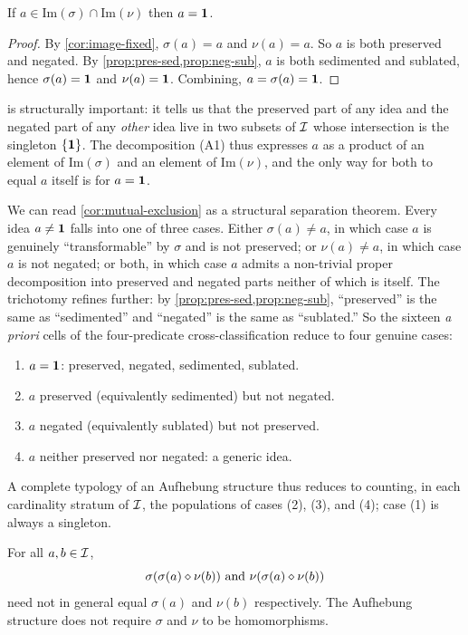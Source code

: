 \begin{corollary}\label{cor:mutual-exclusion}
If $a\in\mathrm{Im}(\sigma)\cap\mathrm{Im}(\nu)$ then $a=\mathbf{1}$.
\end{corollary}

\begin{proof}
By \cref{cor:image-fixed}, $\sigma(a)=a$ and $\nu(a)=a$. So $a$ is
both preserved and negated. By
\cref{prop:pres-sed,prop:neg-sub}, $a$ is both sedimented and
sublated, hence $\sigma(a)=\mathbf{1}$ and $\nu(a)=\mathbf{1}$. Combining,
$a=\sigma(a)=\mathbf{1}$.
\end{proof}

 is structurally important: it tells us
that the preserved part of any idea and the negated part of any
\emph{other} idea live in two subsets of $\mathcal{I}$ whose intersection
is the singleton $\{\mathbf{1}\}$. The decomposition (A1) thus expresses
$a$ as a product of an element of $\mathrm{Im}(\sigma)$ and an element
of $\mathrm{Im}(\nu)$, and the only way for both to equal $a$ itself
is for $a=\mathbf{1}$.

We can read \cref{cor:mutual-exclusion} as a structural separation
theorem. Every idea $a\neq\mathbf{1}$ falls into one of three cases.
Either $\sigma(a)\neq a$, in which case $a$ is genuinely
``transformable'' by $\sigma$ and is not preserved; or $\nu(a)\neq
a$, in which case $a$ is not negated; or both, in which case $a$
admits a non-trivial proper decomposition into preserved and negated
parts neither of which is itself. The trichotomy refines further: by
\cref{prop:pres-sed,prop:neg-sub}, ``preserved'' is the same as
``sedimented'' and ``negated'' is the same as ``sublated.'' So the
sixteen \emph{a priori} cells of the four-predicate
cross-classification reduce to four genuine cases:
\begin{enumerate}
\item $a=\mathbf{1}$: preserved, negated, sedimented, sublated.
\item $a$ preserved (equivalently sedimented) but not negated.
\item $a$ negated (equivalently sublated) but not preserved.
\item $a$ neither preserved nor negated: a generic idea.
\end{enumerate}
A complete typology of an Aufhebung structure thus reduces to
counting, in each cardinality stratum of $\mathcal{I}$, the populations
of cases (2), (3), and (4); case (1) is always a singleton.

\begin{proposition}\label{prop:quasi-proj}
For all $a,b\in\mathcal{I}$,
\[
\sigma(\sigma(a)\mathbin{\diamond}\nu(b))\text{ and }\nu(\sigma(a)\mathbin{\diamond}\nu(b))
\]
need not in general equal $\sigma(a)$ and $\nu(b)$ respectively. The
Aufhebung structure does not require $\sigma$ and $\nu$ to be
homomorphisms.
\end{proposition}

